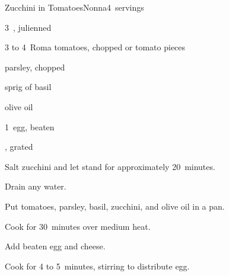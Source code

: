 \begin{recipe}{Zucchini in Tomatoes}{Nonna}{4~servings}

\begin{ingredients}
\item 3~, julienned
\item 3 to 4~Roma tomatoes, chopped or \ltr{\quarter} tomato pieces
\item {} parsley, chopped
\item sprig of basil
\item olive oil
\item 1~egg, beaten
\item {} , grated
\end{ingredients}

\begin{directions}
\item Salt zucchini and let stand for approximately 20~minutes.
\item Drain any water.
\item Put tomatoes, parsley, basil, zucchini, and olive oil in a pan.
\item Cook for 30~minutes over medium heat.
\item Add beaten egg and cheese.
\item Cook for 4 to 5~minutes, stirring to distribute egg.
\end{directions}

\end{recipe}

